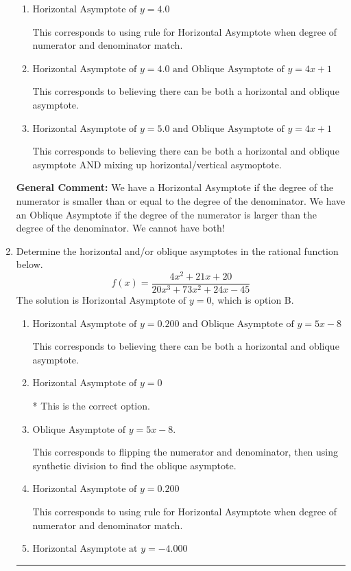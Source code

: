 \documentclass{extbook}[14pt]
\newcommand{\litem}[1]{\item #1

\rule{\textwidth}{0.4pt}}
\begin{document}
\begin{enumerate}
{\begin{enumerate}[label=\Alph*.]
This corresponds to considering where the denominator is equal to 0 as horizontal asymptote.
\item \( \text{Horizontal Asymptote of } y = 4.0  \)

This corresponds to using rule for Horizontal Asymptote when degree of numerator and denominator match.
\item \( \text{Horizontal Asymptote of } y = 4.0 \text{ and Oblique Asymptote of } y = 4x + 1 \)

This corresponds to believing there can be both a horizontal and oblique asymptote.
\item \( \text{Horizontal Asymptote of } y = 5.0 \text{ and Oblique Asymptote of } y = 4x + 1 \)

This corresponds to believing there can be both a horizontal and oblique asymptote AND mixing up horizontal/vertical asymoptote.
\end{enumerate}

\textbf{General Comment:} We have a Horizontal Asymptote if the degree of the numerator is smaller than or equal to the degree of the denominator. We have an Oblique Asymptote if the degree of the numerator is larger than the degree of the denominator. We cannot have both!
}
\litem{
Determine the horizontal and/or oblique asymptotes in the rational function below.
\[ f(x) = \frac{4x^{2} +21 x + 20}{20x^{3} +73 x^{2} +24 x -45} \]The solution is \( \text{Horizontal Asymptote of } y = 0 \), which is option B.\begin{enumerate}[label=\Alph*.]
\item \( \text{Horizontal Asymptote of } y = 0.200 \text{ and Oblique Asymptote of } y = 5x -8 \)

This corresponds to believing there can be both a horizontal and oblique asymptote.
\item \( \text{Horizontal Asymptote of } y = 0 \)

* This is the correct option.
\item \( \text{Oblique Asymptote of } y = 5x -8. \)

This corresponds to flipping the numerator and denominator, then using synthetic division to find the oblique asymptote.
\item \( \text{Horizontal Asymptote of } y = 0.200  \)

This corresponds to using rule for Horizontal Asymptote when degree of numerator and denominator match.
\item \( \text{Horizontal Asymptote at } y = -4.000 \)


\end{enumerate}}
\end{enumerate}
\end{document}
